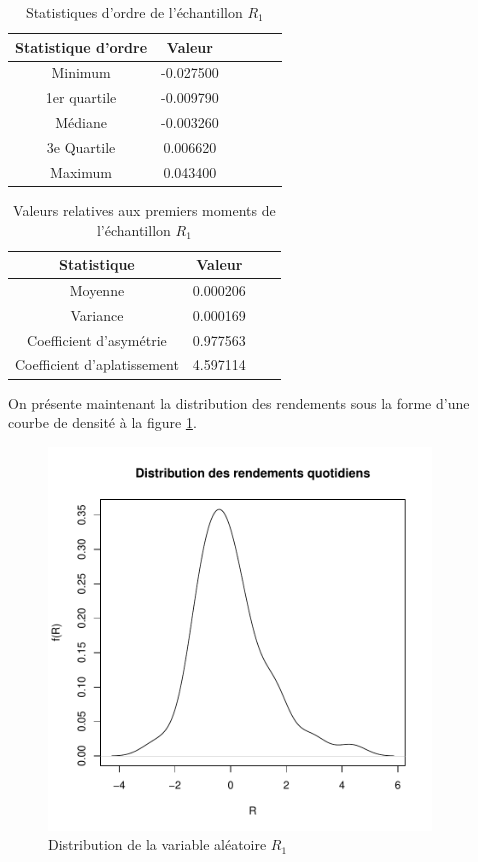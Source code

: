 \begin{table}[!ht]
  \centering
  \begin{tabular}{cccccc}
    \hline
    \textbf{Statistique d'ordre} & \textbf{Valeur} \\
    \hline
    Minimum & -0.027500\\ 
    1er quartile & -0.009790\\ 
    Médiane & -0.003260\\ 
    3e Quartile & 0.006620\\ 
    Maximum & 0.043400\\ 
    \hline
    
  \end{tabular}
  \caption{Statistiques d'ordre de l'échantillon $R_1$}
  \label{tab:statordreR1}
\end{table}

\begin{table}[!ht]
  \centering
  \begin{tabular}{cccc}
    \hline
    \textbf{Statistique} & \textbf{Valeur} \\
    \hline
    Moyenne & 0.000206\\ 
    Variance & 0.000169\\ 
    Coefficient d'asymétrie & 0.977563\\ 
    Coefficient d'aplatissement & 4.597114 \\ 
    \hline
  \end{tabular}
  \caption{Valeurs relatives aux premiers moments de l'échantillon $R_1$}
  \label{tab:statmomentsR1}
\end{table}

On présente maintenant la distribution des rendements sous la forme
d'une courbe de densité à la figure \ref{fig:distributionR1}.

\begin{figure}[!ht]
  \centering
  \includegraphics[height=4in,width=4in]{../graphiques/ABBEYN-histogramme.pdf}
  \caption{Distribution de la variable aléatoire $R_1$}
  \label{fig:distributionR1}
\end{figure}

